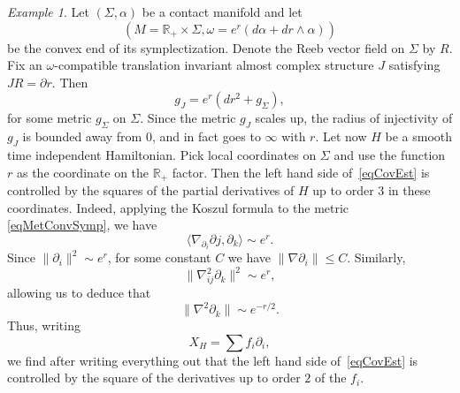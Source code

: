 \documentclass[11pt]{amsart}
\newcommand{\R}{\mathbb{R}}
\theoremstyle{definition}
\theoremstyle{remark}
\newtheorem{ex}[tm]{Example}
\begin{document}
\begin{ex}\label{ExLiouvTame}
Let $(\Sigma,\alpha)$ be a contact manifold and let
\[
(M=\R_+\times\Sigma,\omega=e^r(d\alpha+dr\wedge\alpha ))
\]
be the convex end of its symplectization. Denote the Reeb vector field on $\Sigma$ by $R$. Fix an $\omega$-compatible translation invariant almost complex structure $J$ satisfying $JR=\partial r$. Then
\begin{equation}\label{eqMetConvSymp}
g_J=e^r(dr^2+g_\Sigma),
\end{equation}
for some metric $g_\Sigma$ on $\Sigma$. Since the metric $g_J$ scales up, the radius of injectivity of $g_J$ is bounded away from $0$, and in fact goes to $\infty$ with $r$. Let now $H$ be a smooth time independent Hamiltonian. Pick local coordinates on $\Sigma$ and use the function $r$ as the coordinate on the $\R_+$ factor. Then  the left hand side of~\eqref{eqCovEst} is controlled by the squares of the partial derivatives of $H$ up to order $3$ in these coordinates. Indeed, applying the Koszul formula to the metric \eqref{eqMetConvSymp}, we have
\[
\langle \nabla_{\partial_i}\partial j,\partial_k\rangle\sim e^r.
\]
Since $\|\partial_i\|^2\sim e^r$, for some constant $C$ we have $\|\nabla \partial_i\|\leq C$. Similarly,
\[
\|\nabla^2_{ij}\partial_k\|^2\sim e^r,
\]
allowing us to deduce that
\[
\|\nabla^2\partial_k\|\sim e^{-r/2}.
\]
Thus, writing
\[
X_H=\sum f_i\partial_i,
\]
we find after writing everything out that the left hand side of~\eqref{eqCovEst} is controlled by the square of the derivatives up to order $2$ of the $f_i$.

\end{ex}
\end{document}
